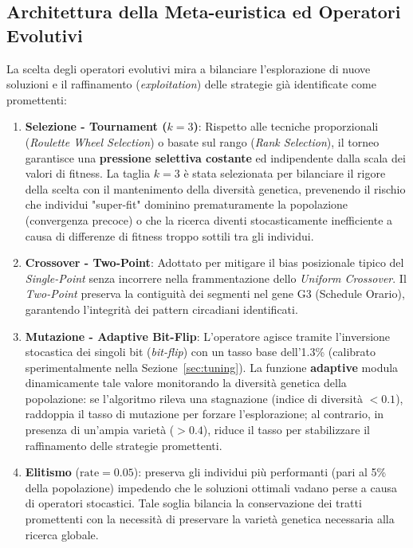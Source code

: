 \subsection{Architettura della Meta-euristica ed Operatori Evolutivi}
\label{sec:operators}
La scelta degli operatori evolutivi mira a bilanciare l'esplorazione di nuove soluzioni e il raffinamento (\textit{exploitation}) delle strategie già identificate come promettenti:

\begin{enumerate}
    \item \textbf{Selezione - Tournament ($k=3$)}: Rispetto alle tecniche proporzionali (\textit{Roulette Wheel Selection}) o basate sul rango (\textit{Rank Selection}), il torneo garantisce una \textbf{pressione selettiva costante} ed indipendente dalla scala dei valori di fitness. La taglia $k=3$ è stata selezionata per bilanciare il rigore della scelta con il mantenimento della diversità genetica, prevenendo il rischio che individui "super-fit" dominino prematuramente la popolazione (convergenza precoce) o che la ricerca diventi stocasticamente inefficiente a causa di differenze di fitness troppo sottili tra gli individui.
    
    \item \textbf{Crossover - Two-Point}: Adottato per mitigare il bias posizionale tipico del \textit{Single-Point} senza incorrere nella frammentazione dello \textit{Uniform Crossover}. Il \textit{Two-Point} preserva la contiguità dei segmenti nel gene G3 (Schedule Orario), garantendo l'integrità dei pattern circadiani identificati.
    
    \item \textbf{Mutazione - Adaptive Bit-Flip}: L'operatore agisce tramite l'inversione stocastica dei singoli bit (\textit{bit-flip}) con un tasso base dell'1.3\% (calibrato sperimentalmente nella Sezione~\ref{sec:tuning}). La funzione \textbf{adaptive} modula dinamicamente tale valore monitorando la diversità genetica della popolazione: se l'algoritmo rileva una stagnazione (indice di diversità $<0.1$), raddoppia il tasso di mutazione per forzare l'esplorazione; al contrario, in presenza di un'ampia varietà ($>0.4$), riduce il tasso per stabilizzare il raffinamento delle strategie promettenti.
    
    \item \textbf{Elitismo} ($\text{rate}=0.05$): preserva gli individui più performanti (pari al 5\% della popolazione) impedendo che le soluzioni ottimali vadano perse a causa di operatori stocastici. Tale soglia bilancia la conservazione dei tratti promettenti con la necessità di preservare la varietà genetica necessaria alla ricerca globale.
\end{enumerate}

